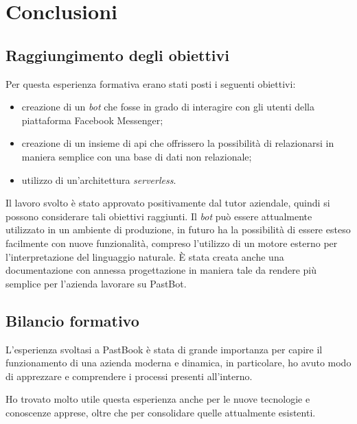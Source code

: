 
\chapter{Conclusioni}

\section{Raggiungimento degli obiettivi}

Per questa esperienza formativa erano stati posti i seguenti obiettivi:
\begin{itemize}
  \item creazione di un \textit{bot} che fosse in grado di interagire con gli
utenti della piattaforma Facebook Messenger;
  \item creazione di un insieme di \gls{api} che offrissero la possibilità di
relazionarsi in maniera semplice con una base di dati non relazionale;
  \item utilizzo di un'architettura \textit{serverless}.
\end{itemize}

Il lavoro svolto è stato approvato positivamente dal tutor aziendale, quindi si
possono considerare tali obiettivi raggiunti.
Il \textit{bot} può essere attualmente utilizzato in un ambiente di produzione,
in futuro ha la possibilità di essere esteso facilmente con nuove funzionalità,
compreso l'utilizzo di un motore esterno per l'interpretazione del linguaggio
naturale.
È stata creata anche una documentazione con annessa progettazione in maniera
tale da rendere più semplice per l'azienda lavorare su PastBot.

\section{Bilancio formativo}

L'esperienza svoltasi a PastBook è stata di grande importanza per capire il
funzionamento di una azienda moderna e dinamica, in particolare, ho avuto modo
di apprezzare e comprendere i processi presenti all'interno.


Ho trovato molto utile questa esperienza anche per le nuove tecnologie e
conoscenze apprese, oltre che per consolidare quelle attualmente esistenti.
